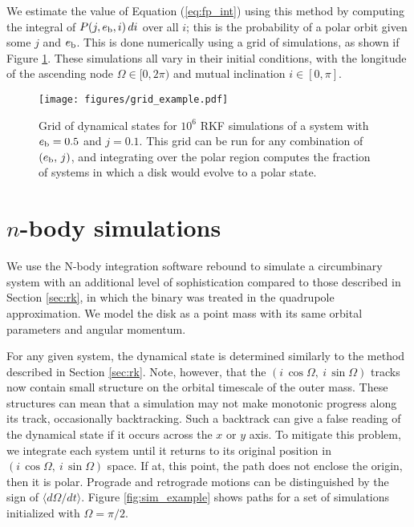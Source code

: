 \documentclass[twocolumn]{aastex631}
\begin{document}
We estimate the value of Equation (\ref{eq:fp_int}) using this method by computing the integral of $P(j,e_{\rm b},i)\,di$ over all $i$; this is the probability of a polar orbit given some $j$ and $e_{\rm b}$. This is done numerically using a grid of simulations, as shown if Figure \ref{fig:grid_example}. These simulations all vary in their initial conditions, with the longitude of the ascending node $\Omega \in [0,2\pi)$ and mutual inclination $i \in [0,\pi]$.

\begin{figure}
    \begin{centering}
        \texttt{[image: figures/grid\_example.pdf]}
    \end{centering}
    \caption{
        Grid of dynamical states for $10^6$ RKF simulations of a system with $e_{\rm b}=0.5$ and $j=0.1$. This grid can be run for any combination of $(e_{\rm b},\,j)$, and integrating over the polar region computes the fraction of systems in which a disk would evolve to a polar state.
    }
    \label{fig:grid_example}
\end{figure}

\section{$n$-body simulations}
\label{sec:reb}

We use the N-body integration software {\sc rebound} \citep{rebound} to simulate a circumbinary system with an additional level of sophistication compared to those described in Section \ref{sec:rk}, in which the binary was treated in the quadrupole approximation. We model the disk as a point mass with its same orbital parameters and angular momentum.

For any given system, the dynamical state is determined similarly to the method described in Section \ref{sec:rk}. Note, however, that the $(i\,\cos{\Omega},~i\,\sin{\Omega})$ tracks now contain small structure on the orbital timescale of the outer mass. These structures can mean that a simulation may not make monotonic progress along its track, occasionally backtracking. Such a backtrack can give a false reading of the dynamical state if it occurs across the $x$ or $y$ axis. To mitigate this problem, we integrate each system until it returns to its original position in $(i\,\cos{\Omega},~i\,\sin{\Omega})$ space. If at, this point, the path does not enclose the origin, then it is polar. Prograde and retrograde motions can be distinguished by the sign of $\langle d\Omega/dt \rangle$. Figure \ref{fig:sim_example} shows paths for a set of simulations initialized with $\Omega = \pi/2$.
\end{document}
